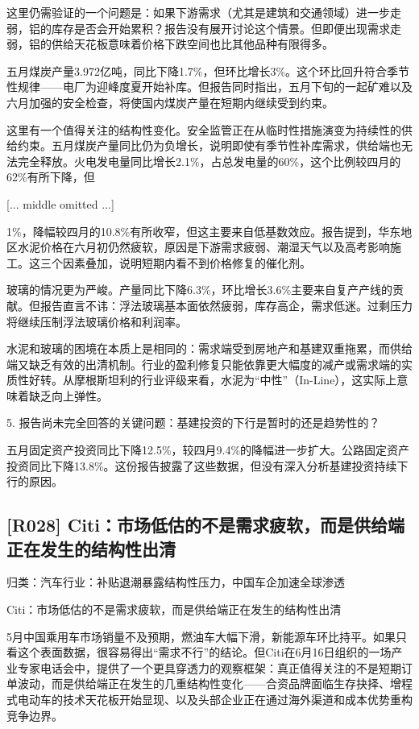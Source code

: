 \documentclass[11pt]{ctexart}
\begin{document}
这里仍需验证的一个问题是：如果下游需求（尤其是建筑和交通领域）进一步走弱，铝的库存是否会开始累积？报告没有展开讨论这个情景。但即便出现需求走弱，铝的供给天花板意味着价格下跌空间也比其他品种有限得多。

五月煤炭产量3.972亿吨，同比下降1.7\%，但环比增长3\%。这个环比回升符合季节性规律——电厂为迎峰度夏开始补库。但报告同时指出，五月下旬的一起矿难以及六月加强的安全检查，将使国内煤炭产量在短期内继续受到约束。

这里有一个值得关注的结构性变化。安全监管正在从临时性措施演变为持续性的供给约束。五月煤炭产量同比仍为负增长，说明即使有季节性补库需求，供给端也无法完全释放。火电发电量同比增长2.1\%，占总发电量的60\%，这个比例较四月的62\%有所下降，但

[... middle omitted ...]

1\%，降幅较四月的10.8\%有所收窄，但这主要来自低基数效应。报告提到，华东地区水泥价格在六月初仍然疲软，原因是下游需求疲弱、潮湿天气以及高考影响施工。这三个因素叠加，说明短期内看不到价格修复的催化剂。

玻璃的情况更为严峻。产量同比下降6.3\%，环比增长3.6\%主要来自复产产线的贡献。但报告直言不讳：浮法玻璃基本面依然疲弱，库存高企，需求低迷。过剩压力将继续压制浮法玻璃价格和利润率。

水泥和玻璃的困境在本质上是相同的：需求端受到房地产和基建双重拖累，而供给端又缺乏有效的出清机制。行业的盈利修复只能依靠更大幅度的减产或需求端的实质性好转。从摩根斯坦利的行业评级来看，水泥为“中性”（In-Line），这实际上意味着缺乏向上弹性。

5. 报告尚未完全回答的关键问题：基建投资的下行是暂时的还是趋势性的？

五月固定资产投资同比下降12.5\%，较四月9.4\%的降幅进一步扩大。公路固定资产投资同比下降13.8\%。这份报告披露了这些数据，但没有深入分析基建投资持续下行的原因。

\subsection{[R028] Citi：市场低估的不是需求疲软，而是供给端正在发生的结构性出清}
{\small\color{refgray}归类：汽车行业：补贴退潮暴露结构性压力，中国车企加速全球渗透}

Citi：市场低估的不是需求疲软，而是供给端正在发生的结构性出清

5月中国乘用车市场销量不及预期，燃油车大幅下滑，新能源车环比持平。如果只看这个表面数据，很容易得出“需求不行”的结论。但Citi在6月16日组织的一场产业专家电话会中，提供了一个更具穿透力的观察框架：真正值得关注的不是短期订单波动，而是供给端正在发生的几重结构性变化——合资品牌面临生存抉择、增程式电动车的技术天花板开始显现、以及头部企业正在通过海外渠道和成本优势重构竞争边界。
\end{document}

